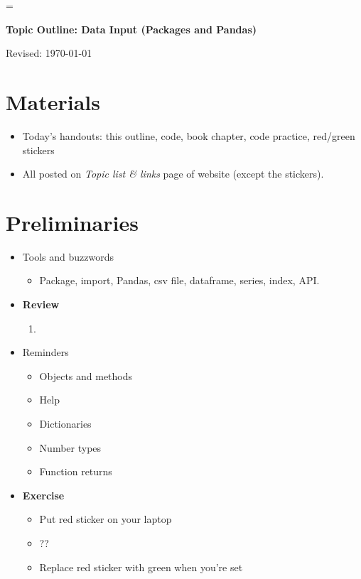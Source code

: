 \documentclass[11pt]{article}
\begin{document}
\parskip=\bigskipamount
\parindent=0.0in
\thispagestyle{empty}


\bigskip\bigskip
\centerline{\Large \bf Topic Outline:  Data Input (Packages and Pandas)}
\centerline{Revised: \today}


\section*{Materials}

\begin{itemize}
\item  Today's handouts:  this outline, code, book chapter, code practice, red/green stickers
\item  All posted on {\it Topic list \& links\/} page of website (except the stickers).
\end{itemize}


\section*{Preliminaries}

\begin{itemize}

\item Tools and buzzwords
\begin{itemize}
\item Package, import, Pandas, csv file, dataframe, series, index, API.  
\end{itemize}

\item {\bf Review} 
\begin{enumerate}
\item 
\end{enumerate} 

\item Reminders
\begin{itemize}
\item Objects and methods 
\item Help 
\item Dictionaries 
\item Number types 
\item Function returns 
\end{itemize}

\item {\bf Exercise}
\begin{itemize}
\item Put red sticker on your laptop
\item ??
\item Replace red sticker with green when you're set
\end{itemize}

\end{itemize}
\end{document}
